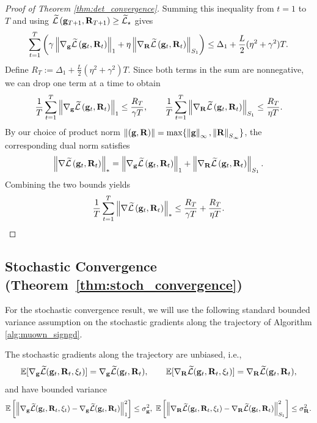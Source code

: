 {\begin{proof}[Proof of Theorem \ref{thm:det_convergence}]
    Summing this inequality from $t=1$ to $T$ and using $\widetilde {\mathcal{L}}\left( \mathbf{g}_{T+1}, \mathbf{R}_{T+1} \right) \geq \widetilde {\mathcal{L}}_\star$ gives
    \begin{equation*}
        \sum_{t=1}^{T}\left( \gamma \left \| \nabla_{\mathbf{g}} \widetilde {\mathcal{L}}\left( \mathbf{g}_t,\mathbf{R}_t \right) \right\|_1 + \eta \left \| \nabla_{\mathbf{R}} \widetilde {\mathcal{L}}\left( \mathbf{g}_t,\mathbf{R}_t \right) \right\|_{S_1} \right)
        \leq \Delta_1 + \frac{L}{2}(\eta^2 + \gamma^2)T.
    \end{equation*}
    Define $R_T := \Delta_1 + \frac{L}{2}(\eta^2 + \gamma^2)T$. Since both terms in the sum are nonnegative, we can drop one term at a time to obtain
    \begin{equation*}
        \frac{1}{T}\sum_{t=1}^T \left \| \nabla_{\mathbf{g}} \widetilde {\mathcal{L}}\left( \mathbf{g}_t,\mathbf{R}_t \right) \right\|_1 \leq \frac{R_T}{\gamma T},
        \qquad
        \frac{1}{T}\sum_{t=1}^T \left \| \nabla_{\mathbf{R}} \widetilde {\mathcal{L}}\left( \mathbf{g}_t,\mathbf{R}_t \right) \right\|_{S_1} \leq \frac{R_T}{\eta T}.
    \end{equation*}
    By our choice of product norm $\left \| (\mathbf{g},\mathbf{R}) \right\| = \max\{\left \| \mathbf{g} \right\|_\infty,\left \| \mathbf{R} \right\|_{S_\infty}\}$, the corresponding dual norm satisfies
    \begin{equation*}
        \left \| \nabla \widetilde {\mathcal{L}}\left( \mathbf{g}_t,\mathbf{R}_t \right) \right\|_* = \left \| \nabla_{\mathbf{g}} \widetilde {\mathcal{L}}\left( \mathbf{g}_t,\mathbf{R}_t \right) \right\|_1 + \left \| \nabla_{\mathbf{R}} \widetilde {\mathcal{L}}\left( \mathbf{g}_t,\mathbf{R}_t \right) \right\|_{S_1}.
    \end{equation*}
    Combining the two bounds yields
    \begin{equation*}
        \frac{1}{T}\sum_{t=1}^T \left \| \nabla \widetilde {\mathcal{L}}\left( \mathbf{g}_t,\mathbf{R}_t \right) \right\|_* \leq \frac{R_T}{\gamma T} + \frac{R_T}{\eta T}.
    \end{equation*}
    
\end{proof}

\subsection{Stochastic Convergence (Theorem~\texorpdfstring{\ref{thm:stoch_convergence}}{2})}
\label{sec:app.conv_analysis.stochastic}

For the stochastic convergence result, we will use the following standard bounded variance assumption on the stochastic gradients along the trajectory of Algorithm \ref{alg:muown_signgd}.
\begin{assumption}\label{assum:bounded_var}
    The stochastic gradients along the trajectory are unbiased, i.e., 
    \begin{equation*}
        \mathbb{E}[\nabla_{\mathbf{g}} \widetilde {\mathcal{L}}(\mathbf{g}_t, \mathbf{R}_t, \xi_t)] = \nabla_{\mathbf{g}} \widetilde {\mathcal{L}}(\mathbf{g}_t, \mathbf{R}_t), \qquad 
        \mathbb{E}[\nabla_{\mathbf{R}} \widetilde {\mathcal{L}}(\mathbf{g}_t, \mathbf{R}_t, \xi_t)] = \nabla_{\mathbf{R}} \widetilde {\mathcal{L}}(\mathbf{g}_t, \mathbf{R}_t),
    \end{equation*}
    and have bounded variance
    \begin{equation*}
        \E \left[\norm{\nabla_{\g} \Ft(\gt, \Rt, \xi_t) - \nabla_{\g} \Ft(\gt, \Rt)}_1^2\right] \leq \sigg^2,  \ 
        \E \left[\trnorm{\nabla_{\Rbf} \Ft(\gt, \Rt, \xi_t) - \nabla_{\Rbf} \Ft(\gt, \Rt)}^2\right] \leq \sigR^2.
    \end{equation*}
\end{assumption}

}
